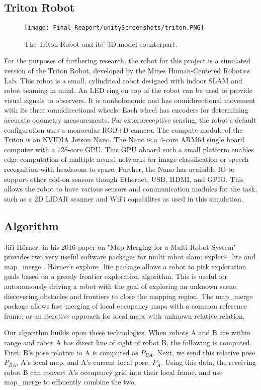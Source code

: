 \documentclass[11pt, conference]{IEEEtran}
\begin{document}
\subsection{Triton Robot}
\begin{figure}[ht]
\texttt{[image: Final Reaport/unityScreenshots/triton.PNG]}
\caption{The Triton Robot and its' 3D model counterpart.}
\label{fig:triton}
\end{figure}
For the purposes of furthering research, the robot for this project is a simulated version of the Triton Robot, developed by the Mines Human-Centered Robotics Lab. 
This robot is a small, cylindrical robot designed with indoor SLAM and robot teaming in mind.
An LED ring on top of the robot can be used to provide visual signals to observers.
It is nonholonomic and has omnidirectional movement with its three omnidirectional wheels. Each wheel has encoders for determining accurate odometry measurements. 
For exteroreceptive sensing, the robot's default configuration uses a monocular RGB$+$D camera. 
The compute module of the Triton is an NVIDIA Jetson Nano. The Nano is a 4-core ARM64 single board computer with a 128-core GPU. This GPU aboard such a small platform enables edge computation of multiple neural networks for image classification or speech recognition with headroom to spare. 
Further, the Nano has available IO to support other add-on sensors though Ethernet, USB, HDMI, and GPIO. This allows the  robot to have various sensors and communication modules for the task, such as a 2D LIDAR scanner and WiFi capabilites as used in this simulation. 

\subsection{Algorithm}
Jiří Hörner, in his 2016 paper on "Map-Merging for a Multi-Robot System" provides two very useful software packages for multi robot slam: explore\_lite and map\_merge  \cite{Horner2016}.
Hörner's explore\_lite package allows a robot to pick exploration goals based on a greedy frontier exploration algorithm. This is useful for autonomously driving a robot with the goal of exploring an unknown scene, discovering obstacles and frontiers to close the mapping region.
The map\_merge package allows fast merging of local occupancy maps with a common reference frame, or an iterative approach for local maps with unknown relative relation. 

Our algorithm builds upon these technologies. When robots A and B are within range and robot A has direct line of sight of robot B, the following is computed. First, B's pose relative to A is computed as $P_{BA}$. Next, we send this relative pose $P_{BA}$, A's local map, and A's current local pose, $P_{A}$. Using this data, the receiving robot B can convert A's occupancy grid into their local frame, and use map\_merge  to efficiently combine the two. 
\end{document}
